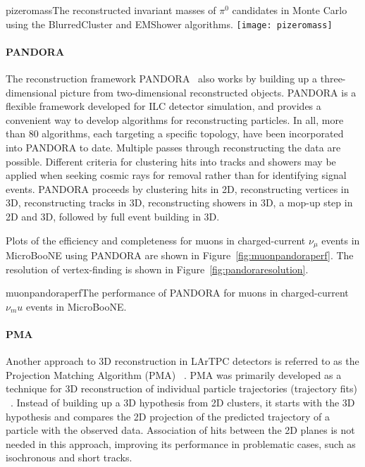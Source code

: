 \begin{cdrfigure}{pizeromass}{The reconstructed invariant masses of $\pi^0$ candidates in
  Monte Carlo using the BlurredCluster and EMShower algorithms.}
\texttt{[image: pizeromass]}
\end{cdrfigure}

\paragraph{PANDORA}
The reconstruction framework PANDORA~\cite{Marshall:2015rfa} 
also works by
building up a three-dimensional picture from two-dimensional
reconstructed objects.  PANDORA is a flexible framework developed for
ILC detector simulation, and provides a convenient way to develop
algorithms for reconstructing particles.  In all, more than 80
algorithms, each targeting a specific topology, have been incorporated
into PANDORA to date.  Multiple passes through reconstructing the data
are possible.  Different criteria for clustering hits into tracks and
showers may be applied when seeking cosmic rays for removal rather than for
identifying signal events.  PANDORA proceeds by clustering hits in 2D,
reconstructing vertices in 3D, reconstructing tracks in 3D,
reconstructing showers in 3D, a mop-up step in 2D and 3D, followed by
full event building in 3D.

Plots of the efficiency and completeness for muons in charged-current $\nu_{\mu}$
events in MicroBooNE using PANDORA are shown in Figure~\ref{fig:muonpandoraperf}.
The resolution of vertex-finding is shown in
Figure~\ref{fig:pandoraresolution}.

\begin{cdrfigure}{muonpandoraperf}{The performance of PANDORA for muons in charged-current
  $\nu_mu$ events in MicroBooNE. }
\end{cdrfigure}


\paragraph{PMA}
Another approach to 3D reconstruction in LArTPC detectors is referred to as the Projection Matching Algorithm
(PMA) ~\cite{pma_algorithm}. 
PMA was primarily developed as a technique for 3D reconstruction
of individual particle trajectories (trajectory fits) ~\cite{icarus3dreco}. Instead of
building up a 3D hypothesis from 2D clusters, it starts with the 3D hypothesis and compares
the 2D projection of the predicted trajectory of a particle with the observed data. Association
of hits between the 2D planes is not needed in this approach, improving its performance in
problematic cases, such as isochronous and short tracks.

